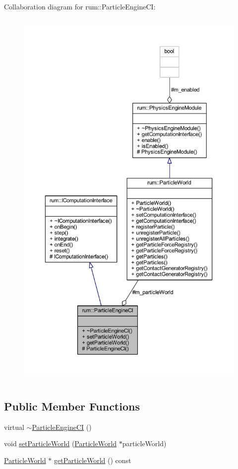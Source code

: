 Collaboration diagram for rum\+:\+:Particle\+Engine\+CI\+:\nopagebreak
\begin{figure}[H]
\begin{center}
\leavevmode
\includegraphics[height=550pt]{classrum_1_1_particle_engine_c_i__coll__graph}
\end{center}
\end{figure}
\subsection*{Public Member Functions}
\begin{DoxyCompactItemize}
\item 
virtual \mbox{\hyperlink{classrum_1_1_particle_engine_c_i_ac1665e30d69943116bb7ee5f38f26429}{$\sim$\+Particle\+Engine\+CI}} ()
\item 
void \mbox{\hyperlink{classrum_1_1_particle_engine_c_i_acdd7e1427c29787af40a28c54e4a065c}{set\+Particle\+World}} (\mbox{\hyperlink{classrum_1_1_particle_world}{Particle\+World}} $\ast$particle\+World)
\item 
\mbox{\hyperlink{classrum_1_1_particle_world}{Particle\+World}} $\ast$ \mbox{\hyperlink{classrum_1_1_particle_engine_c_i_aee3679e2251f80d6d5ab2b37d9208553}{get\+Particle\+World}} () const
\end{DoxyCompactItemize}
